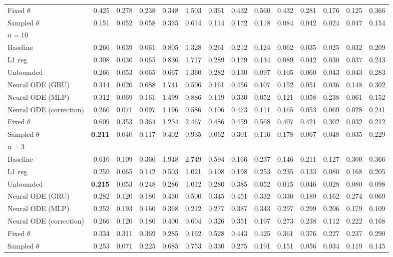 \begin{tabular}{lrrrrrrrrrrrrr}
Fixed $\theta$ & 0.425 & 0.278 & 0.238 & 0.348 & 1.503 & 0.361 & 0.432 & 0.560 & 0.432 & 0.281 & 0.176 & 0.125 & 0.366 \\
Sampled $\theta$ & 0.151 & 0.052 & 0.058 & 0.335 & 0.614 & 0.114 & 0.172 & 0.118 & 0.084 & 0.042 & 0.024 & 0.047 & 0.154 \\
\midrule
\multicolumn{14}{l}{\textbf{$n=10$}} \\
Baseline & 0.266 & 0.039 & 0.061 & 0.805 & 1.328 & 0.261 & 0.212 & 0.124 & 0.062 & 0.035 & 0.025 & 0.032 & 0.209 \\
L1 reg & 0.308 & 0.030 & 0.065 & 0.836 & 1.717 & 0.289 & 0.179 & 0.134 & 0.089 & 0.042 & 0.030 & 0.037 & 0.243 \\
Unbounded & 0.266 & 0.053 & 0.065 & 0.667 & 1.360 & 0.282 & 0.130 & 0.097 & 0.105 & 0.060 & 0.043 & 0.043 & 0.283 \\
Neural ODE (GRU) & 0.314 & 0.020 & 0.088 & 1.741 & 0.506 & 0.161 & 0.456 & 0.107 & 0.152 & 0.051 & 0.036 & 0.148 & 0.302 \\
Neural ODE (MLP) & 0.312 & 0.069 & 0.161 & 1.499 & 0.886 & 0.119 & 0.330 & 0.052 & 0.121 & 0.058 & 0.238 & 0.061 & 0.152 \\
Neural ODE (correction) & 0.266 & 0.071 & 0.097 & 1.196 & 0.586 & 0.106 & 0.473 & 0.111 & 0.165 & 0.053 & 0.069 & 0.028 & 0.241 \\
Fixed $\theta$ & 0.609 & 0.353 & 0.364 & 1.234 & 2.467 & 0.486 & 0.459 & 0.568 & 0.407 & 0.421 & 0.302 & 0.032 & 0.212 \\
Sampled $\theta$ & \textbf{0.211} & 0.040 & 0.117 & 0.402 & 0.935 & 0.062 & 0.301 & 0.116 & 0.178 & 0.067 & 0.048 & 0.035 & 0.229 \\
\midrule
\multicolumn{14}{l}{\textbf{$n=3$}} \\
Baseline & 0.610 & 0.109 & 0.366 & 1.948 & 2.749 & 0.594 & 0.166 & 0.237 & 0.146 & 0.211 & 0.127 & 0.300 & 0.366 \\
L1 reg & 0.259 & 0.065 & 0.142 & 0.503 & 1.021 & 0.108 & 0.198 & 0.253 & 0.235 & 0.133 & 0.080 & 0.168 & 0.205 \\
Unbounded & \textbf{0.215} & 0.053 & 0.248 & 0.286 & 1.012 & 0.280 & 0.385 & 0.052 & 0.015 & 0.046 & 0.028 & 0.080 & 0.098 \\
Neural ODE (GRU) & 0.282 & 0.120 & 0.180 & 0.430 & 0.500 & 0.345 & 0.451 & 0.332 & 0.330 & 0.189 & 0.162 & 0.274 & 0.069 \\
Neural ODE (MLP) & 0.252 & 0.193 & 0.160 & 0.368 & 0.212 & 0.277 & 0.387 & 0.343 & 0.297 & 0.299 & 0.206 & 0.179 & 0.109 \\
Neural ODE (correction) & 0.266 & 0.120 & 0.180 & 0.400 & 0.604 & 0.326 & 0.351 & 0.197 & 0.273 & 0.238 & 0.112 & 0.222 & 0.168 \\
Fixed $\theta$ & 0.334 & 0.311 & 0.369 & 0.285 & 0.162 & 0.528 & 0.443 & 0.425 & 0.361 & 0.376 & 0.227 & 0.237 & 0.290 \\
Sampled $\theta$ & 0.253 & 0.071 & 0.225 & 0.685 & 0.753 & 0.330 & 0.275 & 0.191 & 0.151 & 0.056 & 0.034 & 0.119 & 0.145 \\
\bottomrule
\end{tabular}
